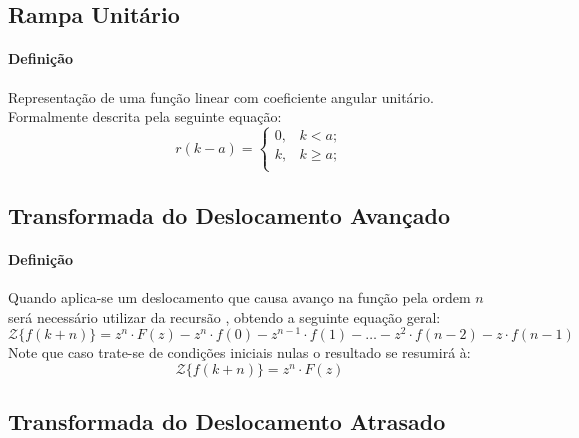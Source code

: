 \documentclass{article}
\begin{document}
\subsection{Rampa Unitário}
    \paragraph{Definição}Representação de uma função linear com coeficiente angular unitário. Formalmente descrita pela seguinte equação:
    \begin{equation}
        \boxed{
            r(k - a) = 
            \begin{cases}
                0, & k < a;\\
                k, & k \ge a;\\
            \end{cases}
        }
    \end{equation}

\subsection{Transformada do Deslocamento Avançado}
    \paragraph{Definição}Quando aplica-se um deslocamento que causa avanço na função pela ordem $n$ será necessário utilizar da recursão , obtendo a seguinte equação geral:
    \begin{equation}
        \boxed{
            \mathcal{Z}\{ f(k+n) \} = 
            z^{n}\cdot F(z) - 
            z^{n} \cdot f(0) - 
            z^{n-1} \cdot f(1) - \dots - 
            z^{2} \cdot f(n-2) - 
            z\cdot f(n-1)
        }
    \end{equation}
    Note que caso trate-se de condições iniciais nulas o resultado se resumirá à:
    \begin{equation*}
        \mathcal{Z}\{ f(k+n) \} = 
        z^{n}\cdot F(z)
    \end{equation*}

\subsection{Transformada do Deslocamento Atrasado}
\end{document}
